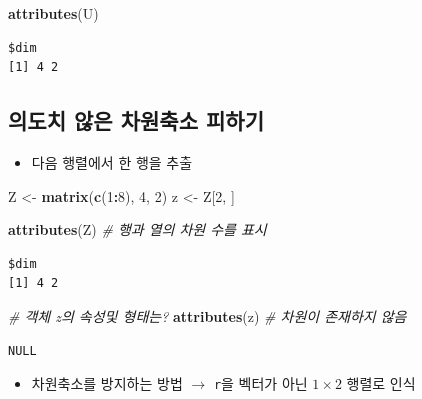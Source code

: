 \documentclass[
  11pt,
]{krantz}
\newenvironment{Shaded}{\begin{snugshade}}{\end{snugshade}}
\newcommand{\CommentTok}[1]{\textcolor[rgb]{0.37,0.37,0.37}{\textit{#1}}}
\newcommand{\DecValTok}[1]{\textcolor[rgb]{0.06,0.06,0.06}{#1}}
\newcommand{\KeywordTok}[1]{\textcolor[rgb]{0.27,0.27,0.27}{\textbf{#1}}}
\newcommand{\NormalTok}[1]{#1}
\newcommand{\OperatorTok}[1]{\textcolor[rgb]{0.43,0.43,0.43}{\textbf{#1}}}
\newcommand{\StringTok}[1]{\textcolor[rgb]{0.5,0.5,0.5}{#1}}
\providecommand{\tightlist}{%
  \setlength{\itemsep}{0pt}\setlength{\parskip}{0pt}}
\begin{document}
\begin{Shaded}
\begin{Highlighting}[]
\KeywordTok{attributes}\NormalTok{(U)}
\end{Highlighting}
\end{Shaded}

\begin{verbatim}
$dim
[1] 4 2
\end{verbatim}

\normalsize

\hypertarget{mat-dim-reduc-sway}{%
\subsection{의도치 않은 차원축소 피하기}\label{mat-dim-reduc-sway}}

\begin{itemize}
\tightlist
\item
  다음 행렬에서 한 행을 추출
\end{itemize}

\footnotesize

\begin{Shaded}
\begin{Highlighting}[]
\NormalTok{Z <-}\StringTok{ }\KeywordTok{matrix}\NormalTok{(}\KeywordTok{c}\NormalTok{(}\DecValTok{1}\OperatorTok{:}\DecValTok{8}\NormalTok{), }\DecValTok{4}\NormalTok{, }\DecValTok{2}\NormalTok{)}
\NormalTok{z <-}\StringTok{ }\NormalTok{Z[}\DecValTok{2}\NormalTok{, ]}

\KeywordTok{attributes}\NormalTok{(Z) }\CommentTok{# 행과 열의 차원 수를 표시}
\end{Highlighting}
\end{Shaded}

\begin{verbatim}
$dim
[1] 4 2
\end{verbatim}

\begin{Shaded}
\begin{Highlighting}[]
\CommentTok{# 객체 z의 속성및 형태는? }
\KeywordTok{attributes}\NormalTok{(z) }\CommentTok{# 차원이 존재하지 않음}
\end{Highlighting}
\end{Shaded}

\begin{verbatim}
NULL
\end{verbatim}

\normalsize

\begin{itemize}
\tightlist
\item
  차원축소를 방지하는 방법 \(\rightarrow\) \texttt{r}을 벡터가 아닌 \(1 \times 2\) 행렬로 인식
\end{itemize}
\end{document}

